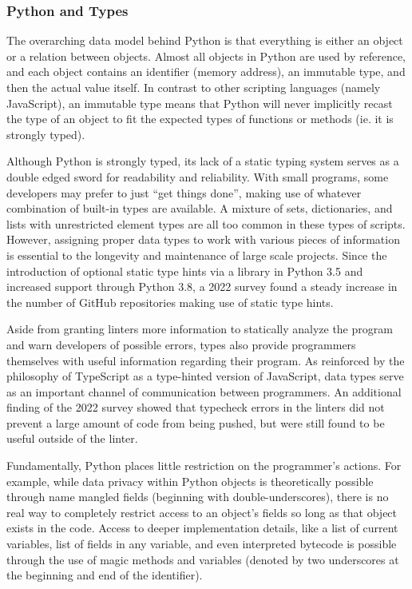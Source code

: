 \documentclass{article}
\begin{document}
\subsubsection{Python and Types}

The overarching data model behind Python is that everything is either an object or a relation between objects.
Almost all objects in Python are used by reference, and each object contains an identifier (memory address),
an immutable type, and then the actual value itself. In contrast to other scripting languages (namely JavaScript),
an immutable type means that Python will never implicitly recast the type of an object to fit the expected types
of functions or methods (ie. it is strongly typed).


Although Python is strongly typed, its lack of a static typing system serves as a double edged sword for
readability and reliability. With small programs, some developers may prefer to just ``get things done'',
making use of whatever combination of built-in types are available.
A mixture of sets, dictionaries, and lists with unrestricted element types are all too common in these types of scripts.
However, assigning proper data types to work with various pieces of information is essential
to the longevity and maintenance of large scale projects. Since the introduction of optional static type hints
via a library in Python 3.5 and increased support through Python 3.8,
a 2022 survey \cite{empiricalTypePython} found a steady increase in the number of GitHub repositories
making use of static type hints.

Aside from granting linters more information to statically analyze the program and warn developers of possible errors,
types also provide programmers themselves with useful information regarding their program. As reinforced
by the philosophy of TypeScript as a type-hinted version of JavaScript, data types serve as an important
channel of communication between programmers. An additional finding of the 2022 survey \cite{empiricalTypePython}
showed that typecheck errors in the linters did not prevent a large amount of code from being pushed, but were
still found to be useful outside of the linter.

Fundamentally, Python places little restriction on the programmer's actions. For example, while
data privacy within Python objects is theoretically possible through name mangled fields (beginning with double-underscores),
there is no real way to completely restrict access to an object's fields so long as that object exists in the code.
Access to deeper implementation details, like a list of current variables, list of fields in any variable, and even
interpreted bytecode is possible through the use of magic methods and variables
(denoted by two underscores at the beginning and end of the identifier).
\end{document}
